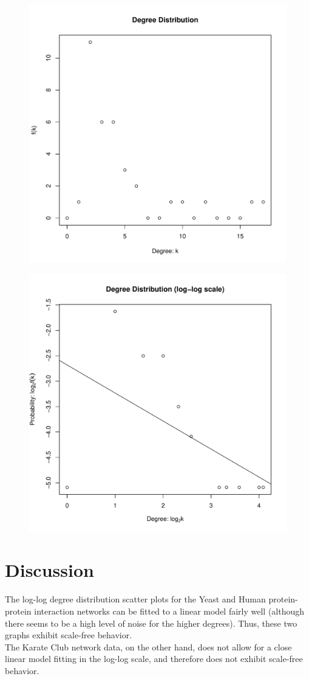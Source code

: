 \documentclass{report}
\begin{document}
\begin{figure}[htp!]
  \centering
  \includegraphics[width=0.65\linewidth]{karate}
\end{figure}
\vspace{-2em}
\begin{figure}[htp!]
  \centering
  \includegraphics[width=0.65\linewidth]{karateLog}
\end{figure}

\newpage

\section*{Discussion}

The log-log degree distribution scatter plots for the Yeast and Human protein-protein interaction networks can be fitted to a linear model fairly well (although there seems to be a high level of noise for the higher degrees). Thus, these two graphs exhibit scale-free behavior.\\

The Karate Club network data, on the other hand, does not allow for a close linear model fitting in the log-log scale, and therefore does not exhibit scale-free behavior.
\end{document}

